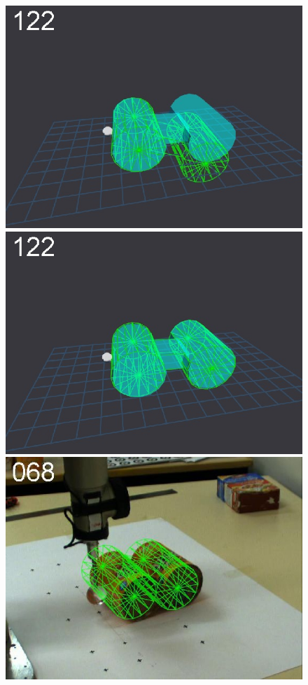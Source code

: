 \begin{figure}[t]
{\includegraphics[width=\imgCXwid]{./C5_2exp_6_2}
\includegraphics[width=\imgCXwid]{./C5_3exp_6_2}
\includegraphics[width=\imgCXwid]{./C2_3exp_75_2}
}
\end{figure}
